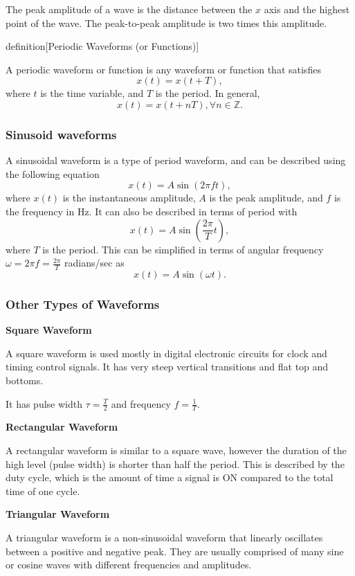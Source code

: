 \documentclass{article}
\begin{document}
The peak amplitude of a wave is the distance between the $x$ axis and the highest point of the wave. The peak-to-peak amplitude is two times this amplitude.

\begin{callout}{definition}[Periodic Waveforms (or Functions)]
\label{definition:t1-d2}

    A periodic waveform or function is any waveform or function that satisfies
    \[
        x(t)=x(t+T),
    \]
    where $t$ is the time variable, and $T$ is the period. In general,
    \[
        x(t)=x(t+nT),\forall n \in\mathbb{Z}.
    \]
\end{callout}

\subsubsection{Sinusoid waveforms}
A sinusoidal waveform is a type of period waveform, and can be described using the following equation
\[
    x(t)=A\sin(2\pi ft),
\]
where $x(t)$ is the instantaneous amplitude, $A$ is the peak amplitude, and $f$ is the frequency in Hz. It can also be described in terms of period with
\[
    x(t)=A\sin \left( \frac{2\pi }{T}t \right),
\]
where $T$ is the period. This can be simplified in terms of angular frequency $\omega =2\pi f=\frac{2\pi }{T}$ radians/sec as
\[
    x(t)=A\sin(\omega t).
\]

\subsubsection{Other Types of Waveforms}
\textbf{Square Waveform}

A square waveform is used mostly in digital electronic circuits for clock and timing control signals. It has very steep vertical transitions and flat top and bottoms.

It has pulse width $\tau =\frac{T}{2}$ and frequency $f=\frac{1}{T}$.

\noindent\textbf{Rectangular Waveform}

A rectangular waveform is similar to a square wave, however the duration of the high level (pulse width) is shorter than half the period. This is described by the duty cycle, which is the amount of time a signal is ON compared to the total time of one cycle.

\noindent\textbf{Triangular Waveform}

A triangular waveform is a non-sinusoidal waveform that linearly oscillates between a positive and negative peak. They are usually comprised of many sine or cosine waves with different frequencies and amplitudes.
\end{document}
